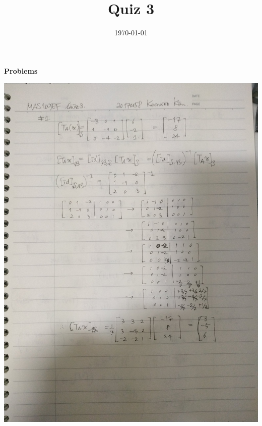 \documentclass{homework}
\title{Quiz 3}
\date{\today}
\begin{document}
\maketitle
\setlength{\parindent}{0pt}
\vspace*{-0.8cm}
{\Large\bf Problems}

\includegraphics[width=\textwidth,origin=c]{prob1.jpg}
\newpage
\end{document}
